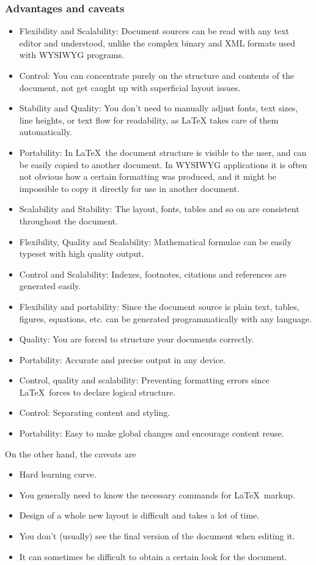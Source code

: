 \documentclass[11pt]{article}
\begin{document}
\subsubsection{Advantages and caveats }
\begin{itemize}
    \item Flexibility and Scalability: Document sources can be read with any text editor and understood, unlike the complex binary and XML formats used with WYSIWYG programs.
    \item Control: You can concentrate purely on the structure and contents of the document, not get caught up with superficial layout issues.
    \item Stability and Quality: You don't need to manually adjust fonts, text sizes, line heights, or text flow for readability, as LaTeX takes care of them automatically.
    \item Portability: In \LaTeX\  the document structure is visible to the user, and can be easily copied to another document. In WYSIWYG applications it is often not obvious how a certain formatting was produced, and it might be impossible to copy it directly for use in another document.
    \item Scalability and Stability: The layout, fonts, tables and so on are consistent throughout the document.
    \item Flexibility, Quality and Scalability: Mathematical formulae can be easily typeset with high quality output.
    \item Control and Scalability: Indexes, footnotes, citations and references are generated easily.
    \item Flexibility and portability: Since the document source is plain text, tables, figures, equations, etc. can be generated programmatically with any language.
    \item Quality: You are forced to structure your documents correctly.
    \item Portability: Accurate and precise output in any device.
    \item Control, quality and scalability: Preventing formatting errors since \LaTeX\ forces to declare logical structure.
    \item Control: Separating content and styling.
    \item Portability: Easy to make global changes and encourage content reuse.
\end{itemize}

On the other hand, the caveats are
\begin{itemize}
    \item Hard learning curve.
    \item You generally need to know the necessary commands for \LaTeX\  markup.
    \item Design of a whole new layout is difficult and takes a lot of time.
    \item You don't (usually) see the final version of the document when editing it.
    \item It can sometimes be difficult to obtain a certain look for the document.
\end{itemize}
\end{document}

